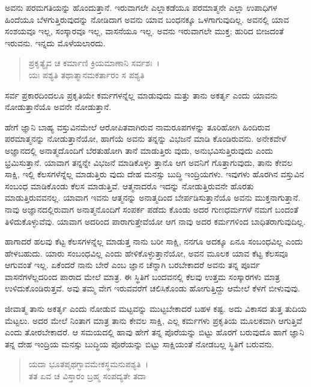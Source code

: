 ಅವನು ಪರಮಗತಿಯನ್ನು ಹೊಂದುತ್ತಾನೆ. ಇರುವಾಗಲೇ ಎಲ್ಲಾಕಡೆಯೂ ಪರಮಾತ್ಮನೇ ಎಲ್ಲಾ ಉಪಾಧಿಗಳ ಹಿಂದೆಯೂ ಬೆಳಗುತ್ತಿರುವುದನ್ನು ನೋಡಿದಾಗ ಅವನು ಯಾವ ಬಂಧನಕ್ಕೂ ಒಳಗಾಗುವುದಿಲ್ಲ. ಅವನಲ್ಲಿ ಯಾವ ಸಂಶಯವೂ ಇಲ್ಲ, ಸಂಸ್ಕಾರವೂ ಇಲ್ಲ, ವಾಸನೆಯೂ ಇಲ್ಲ. ಅವನು ಇರುವಾಗಲೇ ಮುಕ್ತ; ಹುರಿದ ಬೀಜದಂತೆ ಇರುವನು. ಇನ್ನದು ಮೊಳೆಯಲಾರದು.

\begin{verse}
ಪ್ರಕೃತ್ಯೈವ ಚ ಕರ್ಮಾಣಿ ಕ್ರಿಯಮಾಣಾನಿ ಸರ್ವಶಃ~।\\ಯಃ ಪಶ್ಯತಿ ತಥಾತ್ಮಾನಮಕರ್ತಾರಂ ಸ ಪಶ್ಯತಿ 
\end{verse}

{\small ಸರ್ವ ಪ್ರಕಾರದಿಂದಲೂ ಪ್ರಕೃತಿಯೇ ಕರ್ಮಗಳನ್ನೆಲ್ಲ ಮಾಡುವುದು ಮತ್ತು ತಾನು ಅಕರ್ತೃ ಎಂದು ಯಾವನು ನೋಡುತ್ತಾನೆಯೊ ಅವನೇ ನೋಡುತ್ತಾನೆ.}

ಹೇಗೆ ಜ್ಞಾನಿ ಬಾಹ್ಯ ವಸ್ತುವಿನಮೇಲೆ ಆರೋಪಿತವಾಗಿರುವ ನಾಮರೂಪಗಳನ್ನು ತೂರಿಹೋಗಿ ಹಿಂದಿರುವ ಪರಮಾತ್ಮನನ್ನು ನೋಡುತ್ತಾನೆಯೋ, ಹಾಗೆಯೆ ಅವನು ತನ್ನನ್ನು ವಿಭಜನೆ ಮಾಡಿ ಕೊಂಡಿರುವನು. ಅನೇಕವೇಳೆ ಅಜ್ಞಾನದಲ್ಲಿ ಅನಾತ್ಮದೊಂದಿಗೆ ಬೆರತುಹೋಗಿ ತಾನೆ ಮಾಡುತ್ತಿರು ವುದು, ಅನುಭವಿಸುತ್ತಿರುವುದು ಎಂದು ಭ್ರಮಿಸುತ್ತಾನೆ. ಯಾವಾಗ ತನ್ನನ್ನೇ ವಿಭಜನೆ ಮಾಡಿಕೊಳ್ಳು ತ್ತಾನೊ ಆಗ ಅವನಿಗೆ ಗೊತ್ತಾಗುವುದು, ತಾನು ಕೇವಲ ಸಾಕ್ಷಿ, ಇಲ್ಲಿ ಕೆಲಸಗಳೆನ್ನೆಲ್ಲ ಮಾಡುತ್ತಿರು ವುದು ದೇಹ ಮನಸ್ಸು ಬುದ್ಧಿ ಇಂದ್ರಿಯಗಳು. ಇವುಗಳು ಹೊರಗಿನ ವಸ್ತುವಿನ ಸಂಬಂಧ ಮಾಡಿಕೊಂಡು ಕೆಲಸ ಮಾಡುತ್ತಿವೆ. ಆತ್ಮನಾದರೊ ಇದನ್ನು ನೋಡುತ್ತಿರುವನೇ ಹೊರತು ಮಾಡುತ್ತಿರುವವನಲ್ಲ. ಯಾವಾಗ ಇವನು ಆತ್ಮನನ್ನು ಅನಾತ್ಮದಿಂದ ಬೇರ್ಪಡಿಸುತ್ತಾನೆಯೊ ಅವನು ಮುಕ್ತನಾಗುತ್ತಾನೆ. ನಾವು ಅಜ್ಞಾನದಲ್ಲಿರುವಾಗ ಅನಾತ್ಮನೊಂದಿಗೆ ಸಂಪರ್ಕ ಪಡೆದು ಕೊಂಡು ಅದರ ಗುಣಧರ್ಮಗಳೆ ನಮಗೆ ಬಂದಂತೆ ತಿಳಿದುಕೊಳ್ಳುವೆವು. ಯಾವಾಗ ಅದರಿಂದ ಪಾರಾಗುತ್ತೇವೆಯೋ ಆಗ ನಾವು ಅದರ ಕರ್ಮಗಳಿಂದ ಬಾಧಿತರಾಗುವುದಿಲ್ಲ.

ಹಾಗಾದರೆ ಹಲವು ಕೆಟ್ಟ ಕೆಲಸಗಳನ್ನೆಲ್ಲ ಮಾಡುತ್ತ ನಾನು ಬರೀ ಸಾಕ್ಷಿ, ನನಗೂ ಅದಕ್ಕೂ ಏನೂ ಸಂಬಂಧವಿಲ್ಲ ಎಂದು ಹೇಳಬಹುದು. ಯಾರು ಸಂಬಂಧವಿಲ್ಲ ಎಂದು ಹೇಳಿಕೊಳ್ಳುತ್ತಾನೆಯೋ, ಅವನ ಮೂಲಕ ಯಾವ ಕೆಟ್ಟ ಕೆಲಸವೂ ಆಗುವಂತೆ ಇಲ್ಲ. ಏಕೆಂದರೆ ನಾನು ಬೇರೆ ಎಂಬ ಜ್ಞಾನ ಚೆನ್ನಾಗಿ ಬರಬೇಕಾದರೆ ಅವನು ತನ್ನ ಪೂರ್ವ ವಾಸನೆಗಳೆಲ್ಲದರಿಂದ ಪಾರಾದ ಮೇಲೆ ಮಾತ್ರ. ಈ ಸ್ಥಿತಿಗೆ ಬಂದವನಲ್ಲಿ ಕೆಲವು ಉತ್ತಮ ಸಂಸ್ಕಾರಗಳು ಮಾತ್ರ ಉಳಿದುಕೊಂಡಿರುತ್ತವೆ. ಅವು ತಮ್ಮ ವೇಗ ಇರುವವರೆಗೆ ಚಲಿಸಿಕೊಂಡು ಹೋಗುತ್ತಿದ್ದು ಆಮೇಲೆ ಕೆಳಗೆ ಬೀಳುವುವು.

ಜೀವಾತ್ಮ ತಾನು ಅಕರ್ತೃ ಎಂದು ನೋಡುವ ಮಟ್ಟವನ್ನು ಮುಟ್ಟಬೇಕಾದರೆ ಬಹಳ ಕಷ್ಟ. ಅದು ವಿಕಾಸದ ತುತ್ತ ತುದಿಯ ಮೆಟ್ಟಲು. ಅದರ ಮೇಲೆ ನಿಂತಾಗ ಮಾತ್ರ ತಾನು ಕೇವಲ ಸಾಕ್ಷಿ, ಎಲ್ಲ ಕರ್ಮಗಳು ಪ್ರಕೃತಿಯ ಮೂಲಕವಾಗಿ ಆಗುತ್ತಿವೆ ಎಂದು ತೋರಬೇಕಾದರೆ. ಆ ಸಮಯದಲ್ಲಿ ಹಾವು ಹೇಗೆ ತನ್ನ ಪೊರೆಯನ್ನು ಬಿಟ್ಟು ಹೊರಗೆ ಬರುವುದೊ ಹಾಗೆ ಜ್ಞಾನಿ ತನ್ನ ದೇಹ ಇಂದ್ರಿಯ ಮನಸ್ಸು ಬುದ್ಧಿಯ ಪೊರೆಯನ್ನು ಬಿಟ್ಟು ಸಾಕ್ಷಿಯಂತೆ ನೋಡಬಲ್ಲ ಸ್ಥಿತಿಗೆ ಬರುವನು.

\begin{verse}
ಯದಾ ಭೂತಪೃಥಗ್ಭಾವಮೇಕಸ್ಥಮನುಪಶ್ಯತಿ~।\\ತತ ಏವ ಚ ವಿಸ್ತಾರಂ ಬ್ರಹ್ಮ ಸಂಪದ್ಯತೇ ತದಾ 
\end{verse}

